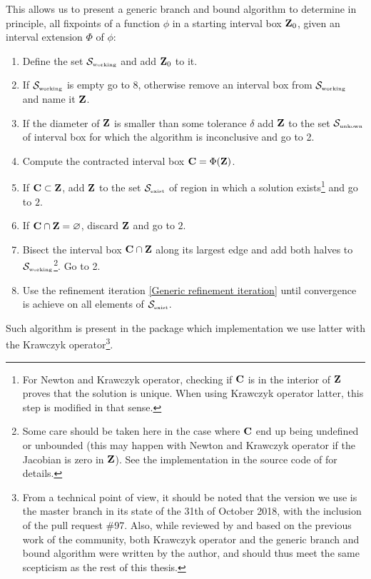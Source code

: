 \documentclass[
11pt, %
american, %
singlespacing, %
final, %
nolistspacing, %
liststotoc, %
headsepline, %
]{MastersDoctoralThesis} %
\begin{document}
This allows us to present a generic branch and bound algorithm to determine in principle, all fixpoints of a function $\phi$ in a starting interval box $\boldsymbol{\mathrm{Z}}_0$, given an interval extension $\Phi$ of $\phi$:
\begin{enumerate}
	\item Define the set $\mathcal{S}_{\text{\tiny working}}$ and add $\boldsymbol{\mathrm{Z}}_0$ to it.
	\item If $\mathcal{S}_{\text{\tiny working}}$ is empty go to 8, otherwise remove an interval box from $\mathcal{S}_{\text{\tiny working}}$ and name it $\boldsymbol{\mathrm{Z}}$.
	\item If the diameter of $\boldsymbol{\mathrm{Z}}$ is smaller than some tolerance $\delta$ add $\boldsymbol{\mathrm{Z}}$ to the set $\mathcal{S}_{\text{\tiny unkown}}$ of interval box for which the algorithm is inconclusive and go to 2.
	\item Compute the contracted interval box $\boldsymbol{\mathrm{C}} = \Phi(\boldsymbol{\mathrm{Z}})$.
	\item If $\boldsymbol{\mathrm{C}} \subset \boldsymbol{\mathrm{Z}}$, add $\boldsymbol{\mathrm{Z}}$ to the set $\mathcal{S}_{\text{\tiny exist}}$ of region in which a solution exists\footnote{For Newton and Krawczyk operator, checking if $\boldsymbol{\mathrm{C}}$ is in the interior of $\boldsymbol{\mathrm{Z}}$ proves that the solution is unique. When using Krawczyk operator latter, this step is modified in that sense.} and go to $2$.
	\item If $\boldsymbol{\mathrm{C}} \cap \boldsymbol{\mathrm{Z}} = \varnothing$, discard $\boldsymbol{\mathrm{Z}}$ and go to $2$.
	\item Bisect the interval box $\boldsymbol{\mathrm{C}} \cap \boldsymbol{\mathrm{Z}}$ along its largest edge and add both halves to $\mathcal{S}_{\text{\tiny working}}$\footnote{Some care should be taken here in the case where $\boldsymbol{\mathrm{C}}$ end up being undefined or unbounded (this may happen with Newton and Krawczyk operator if the Jacobian is zero in $\boldsymbol{\mathrm{Z}}$). See the implementation in the source code of \cite{intervalrootfinding} for details.}. Go to 2.
	\item Use the refinement iteration \eqref{Generic refinement iteration} until convergence is achieve on all elements of $\mathcal{S}_{\text{\tiny exist}}$.
\end{enumerate}

Such algorithm is present in the package  \cite{intervalrootfinding} which implementation we use latter with the Krawczyk operator\footnote{From a technical point of view, it should be noted that the version we use is the master branch in its state of the 31th of October 2018, with the inclusion of the pull request {\#}97. Also, while reviewed by and based on the previous work of the community, both Krawczyk operator and the generic branch and bound algorithm were written by the author, and should thus meet the same scepticism as the rest of this thesis.}.
\end{document}
